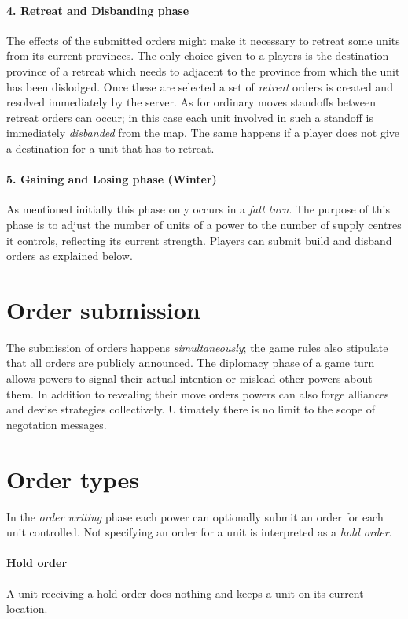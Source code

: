 \documentclass[pdftex,12pt,a4paper]{report}
\begin{document}
\paragraph{4. Retreat and Disbanding phase}
The effects of the submitted orders might make it necessary to retreat
some units from its current provinces. The only choice given to a
players is the destination province of a retreat which needs to
adjacent to the province from which the unit has been dislodged. Once
these are selected a set of \textit{retreat} orders is created and
resolved immediately by the server. As for ordinary moves standoffs
between retreat orders can occur; in this case each unit involved in
such a standoff is immediately \textit{disbanded} from the map. The
same happens if a player does not give a destination for a unit that
has to retreat.

\paragraph{5. Gaining and Losing phase (Winter)}
As mentioned initially this phase only occurs in a \textit{fall turn}.
The purpose of this phase is to adjust the number of units of a power
to the number of supply centres it controls, reflecting its current
strength. Players can submit build and disband orders as explained
below. 

\section{Order submission}

The submission of orders happens \textit{simultaneously}; the game
rules also stipulate that all orders are publicly announced. The diplomacy
phase of a game turn allows powers to signal their actual intention or
mislead other powers about them. In addition to revealing their move
orders powers can also forge alliances and devise strategies
collectively. Ultimately there is no limit to the scope of negotation
messages.

\section{Order types}

In the \textit{order writing} phase each power can optionally submit
an order for each unit controlled. Not specifying an order for a 
unit is interpreted as a \textit{hold order}. 

\paragraph{Hold order}
A unit receiving a hold order does nothing and keeps a unit on its 
current location. 
\end{document}
